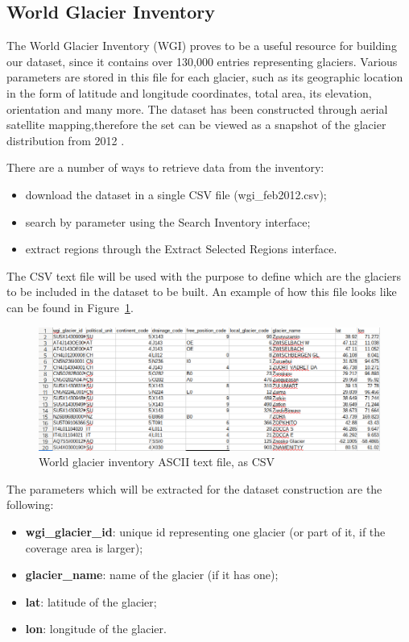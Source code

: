 \documentclass[12pt, a4paper]{report}
\begin{document}
	\subsection{World Glacier Inventory}
	\label{seq:wgi}
	
	\par The World Glacier Inventory (WGI) proves to be a useful resource for building our dataset, since it contains over 130,000 entries representing glaciers. Various parameters are stored in this file for each glacier, such as its geographic location in the form of latitude and longitude coordinates, total area, its elevation, orientation and many more. The dataset has been constructed through aerial satellite mapping,therefore the set can be viewed as a snapshot of the glacier distribution from 2012 \cite{WGI}.  
	
	\par There are a number of ways to retrieve data from the inventory:
	\begin{itemize}
		\item download the dataset in a single CSV file (wgi\_feb2012.csv);
		\item search by parameter using the Search Inventory interface;
		\item extract regions through the Extract Selected Regions interface.
	\end{itemize}

	\par The CSV text file will be used with the purpose to define which are the glaciers to be included in the dataset to be built. An example of how this file looks like can be found in Figure~\ref{fig:WGI_ASCII}.
	
	\begin{figure}[h]
		\centering
		\includegraphics[scale=0.5]{../images/wgi_ASCII_file.png}
		\caption{World glacier inventory ASCII text file, as CSV}
		\label{fig:WGI_ASCII}
	\end{figure}
	
	\par The parameters which will be extracted for the dataset construction are the following:
	\begin{itemize}
		\item \textbf{wgi\_glacier\_id}: unique id representing one glacier (or part of it, if the coverage area is larger);
		\item \textbf{glacier\_name}: name of the glacier (if it has one);
		\item \textbf{lat}: latitude of the glacier;
		\item \textbf{lon}: longitude of the glacier.
	\end{itemize}
\end{document}
